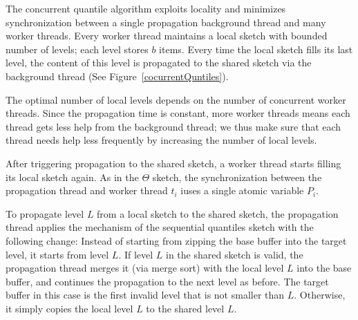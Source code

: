 The concurrent quantile algorithm exploits locality and minimizes
synchronization between a single propagation
background thread and many worker threads.
Every worker thread maintains a local sketch with bounded number
of levels; each level stores $b$ items. 
Every time the local sketch fills its last level, 
the content of this  level is propagated to the
shared sketch via the background thread (See Figure~\ref{cocurrentQuntiles}).

The optimal number of local levels depends on the number of
concurrent worker threads.
Since  the propagation time is constant, more worker threads means each thread gets
less help from the background thread; we thus make sure that each thread needs help
less frequently by increasing the number of
local levels. 

After triggering propagation to the shared sketch,
a worker thread starts filling its local sketch again.
As in the $\Theta$ sketch, the synchronization between the
propagation thread and  worker thread $t_i$ iuses a 
single atomic variable $P_i$.

To propagate level $L$ from a local sketch to the shared sketch,
the propagation thread applies the mechanism of the
sequential quantiles sketch with the following
change:
Instead of starting from zipping the base buffer
into the target level, it starts from level $L$.
If level $L$ in the shared sketch is valid, the propagation
thread merges it (via merge sort) with the local level $L$ into
the base buffer, and continues the propagation to the next level
as before.
The target buffer in this case is the first invalid level that is
not smaller than $L$.
Otherwise, it simply copies the local level $L$ to the shared level
$L$.

